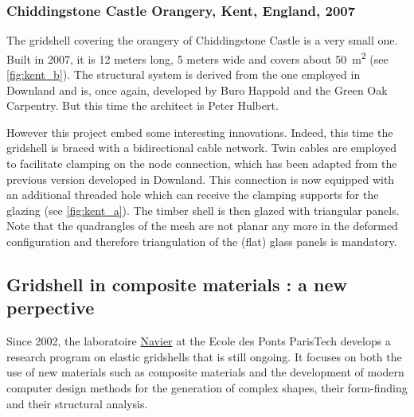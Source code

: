 \subsubsection{Chiddingstone Castle Orangery, Kent, England, 2007}
The gridshell covering the orangery of Chiddingstone Castle is a very small one. Built in 2007, it is 12 meters long, 5 meters wide and covers about \SI{50}{m^2} (see \cref{fig:kent_b}). The structural system is derived from the one employed in Downland and is, once again, developed by Buro Happold and the Green Oak Carpentry. But this time the architect is Peter Hulbert.

However this project embed some interesting innovations. Indeed, this time the gridshell is braced with a bidirectional cable network. Twin cables are employed to facilitate clamping on the node connection, which has been adapted from the previous version developed in Downland. This connection is now equipped with an additional threaded hole which can receive the clamping supports for the glazing (see \cref{fig:kent_a}). The timber shell is then glazed with triangular panels. Note that the quadrangles of the mesh are not planar any more in the deformed configuration and therefore triangulation of the (flat) glass panels is mandatory.


\subsection{Gridshell in composite materials : a new perpective}
Since 2002, the laboratoire \href{http://navier.enpc.fr}{Navier} at the Ecole des Ponts ParisTech develops a research program on elastic gridshells that is still ongoing. It focuses on both the use of new materials such as composite materials and the development of modern computer design methods for the generation of complex shapes, their form-finding and their structural analysis.

